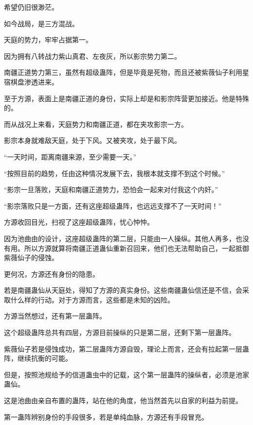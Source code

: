 
\begin{this_body}



希望仍旧很渺茫。

如今战局，是三方混战。

天庭的势力，牢牢占据第一。

因为拥有八转战力紫山真君、左夜灰，所以影宗势力第二。

南疆正道势力第三，虽然有超级蛊阵，但是毕竟是死物，而且还被紫薇仙子利用星宿棋盘渗透进来。

至于方源，表面上是南疆正道的身份，实际上却是和影宗阵营更加接近。他是特殊的。

而从战况上来看，天庭势力和南疆正道，都在夹攻影宗一方。

影宗本身就难敌天庭，处于下风。又被夹攻，处于最下风。

“一天时间，距离南疆来源，至少需要一天。”

“按照目前的趋势，任由这种情况发展下去，我根本就支撑不到这个时候。”

“影宗一旦落败，天庭和南疆正道势力，恐怕会一起来对付我这个内奸。”

“影宗落败只是一方面，还有这座超级蛊阵，也远远支撑不了一天时间！”

方源收回目光，扫视了这座超级蛊阵，忧心忡忡。

因为池曲由的设计，这座超级蛊阵的第二层，只能由一人操纵。其他人再多，也没有用。所以方源就算将南疆正道蛊仙重新召回来，他们也无法帮助自己，一起抵御紫薇仙子的侵蚀。

更何况，方源还有身份的隐患。

若是南疆蛊仙从天庭处，得知了方源的真实身份。这些南疆蛊仙信还是不信，会采取什么样的行动。对于方源而言，这些都是未知的凶险。

方源当然想过，还有第一层蛊阵。

这个超级蛊阵总共有四层，方源目前操纵的只是第二层，还剩下第一层蛊阵。

紫薇仙子若是侵蚀成功，第二层蛊阵方源自毁，理论上而言，还会有拉起第一层蛊阵，继续抗衡的可能。

但是，按照池规给予的信道蛊虫中的记载，这个第一层蛊阵的操纵者，必须是池家蛊仙。

这是池曲由亲自布置的蛊阵，站在他的角度，他当然首先以自家的利益为前提。

第一蛊阵辨别身份的手段很多，若是单纯血脉，方源还有手段冒充。


\end{this_body}

